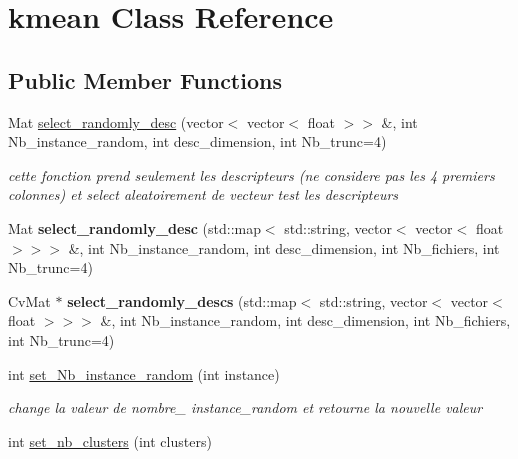 \hypertarget{classkmean}{
\section{kmean Class Reference}
\label{classkmean}
}
\subsection*{Public Member Functions}
\begin{DoxyCompactItemize}
\item 
\hypertarget{classkmean_a953d3433332149709e7fa7876160602a}{
Mat \hyperlink{classkmean_a953d3433332149709e7fa7876160602a}{select\_\-randomly\_\-desc} (vector$<$ vector$<$ float $>$$>$ \&, int Nb\_\-instance\_\-random, int desc\_\-dimension, int Nb\_\-trunc=4)}
\label{classkmean_a953d3433332149709e7fa7876160602a}

\begin{DoxyCompactList}\small\item\em cette fonction prend seulement les descripteurs (ne considere pas les 4 premiers colonnes) et select aleatoirement de vecteur test les descripteurs \end{DoxyCompactList}\item 
\hypertarget{classkmean_aa4afe68cd61e22bf41cbe9044b871f0e}{
Mat {\bfseries select\_\-randomly\_\-desc} (std::map$<$ std::string, vector$<$ vector$<$ float $>$$>$$>$ \&, int Nb\_\-instance\_\-random, int desc\_\-dimension, int Nb\_\-fichiers, int Nb\_\-trunc=4)}
\label{classkmean_aa4afe68cd61e22bf41cbe9044b871f0e}

\item 
\hypertarget{classkmean_a1e6f6e35399a1f640c922e9eaff525cf}{
CvMat $\ast$ {\bfseries select\_\-randomly\_\-descs} (std::map$<$ std::string, vector$<$ vector$<$ float $>$$>$$>$ \&, int Nb\_\-instance\_\-random, int desc\_\-dimension, int Nb\_\-fichiers, int Nb\_\-trunc=4)}
\label{classkmean_a1e6f6e35399a1f640c922e9eaff525cf}

\item 
\hypertarget{classkmean_a23a7dc3d8c49703f051787b4f3bcaf82}{
int \hyperlink{classkmean_a23a7dc3d8c49703f051787b4f3bcaf82}{set\_\-Nb\_\-instance\_\-random} (int instance)}
\label{classkmean_a23a7dc3d8c49703f051787b4f3bcaf82}

\begin{DoxyCompactList}\small\item\em change la valeur de nombre\_\- instance\_\-random et retourne la nouvelle valeur \end{DoxyCompactList}\item 
\hypertarget{classkmean_ab8afcd6a426a0b90f1c51572bb9ce162}{
int \hyperlink{classkmean_ab8afcd6a426a0b90f1c51572bb9ce162}{set\_\-nb\_\-clusters} (int clusters)}
\label{classkmean_ab8afcd6a426a0b90f1c51572bb9ce162}


\end{DoxyCompactItemize}

